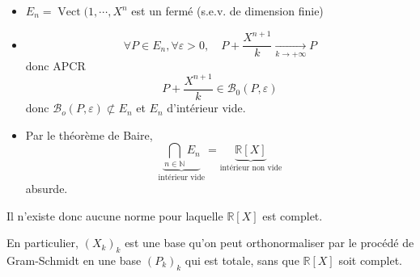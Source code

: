 \documentclass{article}
\theoremstyle{definition}
\DeclareMathOperator{\Vect}{Vect}
\begin{document}
\begin{itemize}
    \item $E_n=\Vect(1, \cdots, X^n$ est un fermé (s.e.v. de dimension finie)
    \item \[
    \forall P\in E_n, \forall \varepsilon>0, \quad P+\frac{X^{n+1}}k\xrightarrow[k\to+\infty]{} P
    \] donc APCR \[
        P+\frac{X^{n+1}}k \in \mathcal B_0(P, \varepsilon)
    \]
    donc $\mathcal B_o(P, \varepsilon)\not\subset E_n$ et $E_n$ d'intérieur vide.
    \item Par le théorème de Baire, \[
        \underbrace{\bigcap_{n\in\mathbb N} E_n}_{\text{intérieur vide}}=\underbrace{\mathbb R[X]}_{\text{intérieur non vide}}
    \]
    absurde.
\end{itemize}

Il n'existe donc aucune norme pour laquelle $\mathbb R[X]$ est complet.

En particulier, $(X_k)_k$ est une base qu'on peut orthonormaliser par le procédé de Gram-Schmidt en une base $(P_k)_k$ qui est totale, sans que $\mathbb R[X]$ soit complet.
\end{document}
